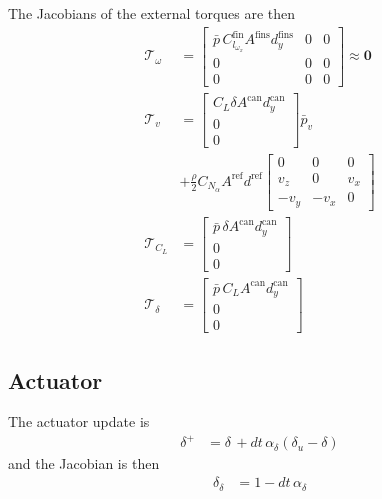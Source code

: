 The Jacobians of the external torques are then
\begin{align}
    \mathcal{T}_\omega &=
    \begin{bmatrix} \bar p \, C^\text{fin}_{l_{\omega_x}} A^\text{fins} d^\text{fins}_y & 0 & 0 \\ 0 & 0 & 0 \\ 0 & 0 & 0  \end{bmatrix} \approx \bm 0
    \\
    \mathcal{T}_v &= 
    \begin{bmatrix} C_L \delta A^\text{can} d^\text{can}_y \\ 0 \\ 0 \end{bmatrix} \bar p_v 
    \\
    &+ \frac{\rho}{2}
    C_{N_\alpha} A^\text{ref} d^\text{ref}
    \begin{bmatrix} 
    0 & 0 & 0 \\
    v_z & 0 & v_x \\
    -v_y & -v_x & 0
    \end{bmatrix}
    \\
    \mathcal{T}_{C_L} &=
    \begin{bmatrix} \bar p \, \delta A^\text{can} d^\text{can}_y  \\ 0 \\ 0 \end{bmatrix} 
    \\
    \mathcal{T}_\delta &=
    \begin{bmatrix} \bar p \, C_L A^\text{can} d^\text{can}_y \\ 0 \\ 0  \end{bmatrix} 
\end{align}

\subsection{Actuator}
\label{sec:jacobians-actor}

The actuator update is 
\begin{align}
    \delta^+ &= \delta \,+ dt \, \alpha_\delta (\delta_u - \delta)
\end{align}
and the Jacobian is then
\begin{align}
    \delta_\delta &= 1 - dt \, \alpha_\delta
\end{align}

